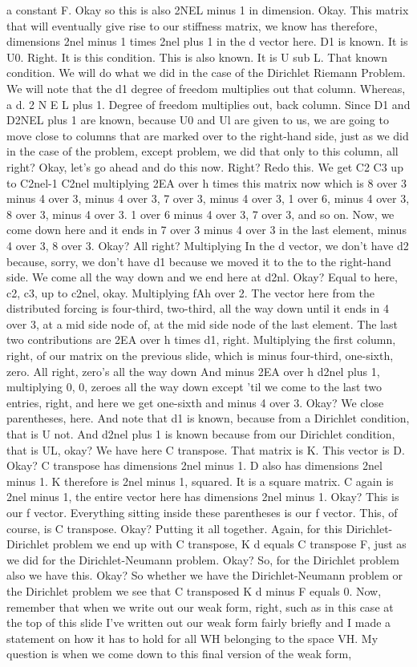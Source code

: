 \documentclass[10pt]{article}
\begin{document}
{a constant F. Okay so this is also 2NEL minus 1 in dimension. Okay. This matrix that will eventually give rise to our stiffness matrix, we know has therefore, dimensions 2nel minus 1 times 2nel plus 1 in the d vector here. D1 is known. It is U0. Right. It is this condition. This is also known. It is U sub L. That known condition. We will do what we did in the case of the Dirichlet Riemann Problem. We will note that the d1 degree of freedom multiplies out that column. Whereas, a d. 2 N E L plus 1. Degree of freedom multiplies out, back column. Since D1 and D2NEL plus 1 are known, because U0 and Ul are given to us, we are going to move close to columns that are marked over to the right-hand side, just as we did in the case of the problem, except  problem, we did that only to this column, all right? Okay, let's go ahead and do this now. Right? Redo this. We get C2 C3 up to C2nel-1 C2nel multiplying 2EA over h times this matrix now which is 8 over 3 minus 4 over 3, minus 4 over 3, 7 over 3, minus 4 over 3, 1 over 6, minus 4 over 3, 8 over 3, minus 4 over 3. 1 over 6 minus 4 over 3, 7 over 3, and so on. Now, we come down here and it ends in 7 over 3 minus 4 over 3 in the last element, minus 4 over 3, 8 over 3. Okay? All right? Multiplying In the d vector, we don't have d2 because, sorry, we don't have d1 because we moved it to the to the right-hand side. We come all the way down and we end here at d2nl. Okay? Equal to here, c2, c3, up to c2nel, okay. Multiplying fAh over 2. The vector here from the distributed forcing is four-third, two-third, all the way down until it ends in 4 over 3, at a mid side node of, at the mid side node of the last element. The last two contributions are 2EA over h times d1, right. Multiplying the first column, right, of our matrix on the previous slide, which is minus four-third, one-sixth, zero. All right, zero's all the way down And minus 2EA over h d2nel plus 1, multiplying 0, 0, zeroes all the way down except 'til we come to the last two entries, right, and here we get one-sixth and minus 4 over 3. Okay? We close parentheses, here. And note that d1 is known, because from a Dirichlet condition, that is U not. And d2nel plus 1 is known because from our Dirichlet condition, that is UL, okay? We have here C transpose. That matrix is K. This vector is D. Okay? C transpose has dimensions 2nel minus 1. D also has dimensions 2nel minus 1. K therefore is 2nel minus 1, squared. It is a square matrix. C again is 2nel minus 1, the entire vector here has dimensions 2nel minus 1. Okay? This is our f vector. Everything sitting inside these parentheses is our f vector. This, of course, is C transpose. Okay? Putting it all together. Again, for this Dirichlet-Dirichlet problem we end up with C transpose, K d equals C transpose F, just as we did for the Dirichlet-Neumann problem. Okay? So, for the Dirichlet problem also we have this. Okay? So whether we have the Dirichlet-Neumann problem or the Dirichlet problem we see that C transposed K d minus F equals 0. Now, remember that when we write out our weak form, right, such as in this case at the top of this slide I've written out our weak form fairly briefly and I made a statement on how it has to hold for all WH belonging to the space VH. My question is when we come down to this final version of the weak form, }
\end{document}
